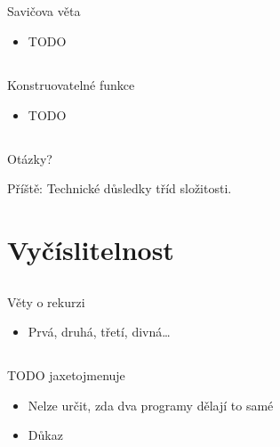 \documentclass{beamer}
\begin{document}
\subsection{}
\begin{frame}{Savičova věta}
\begin{itemize}
\item TODO
\end{itemize}
\end{frame}

\subsection{}
\begin{frame}{Konstruovatelné funkce}
\begin{itemize}
\item TODO
\end{itemize}
\end{frame}

\subsection{}
\begin{frame}{Otázky?}
\begin{center}
Příště: Technické důsledky tříd složitosti.
\end{center}
\end{frame}

\section{Vyčíslitelnost}

\subsection{}
\begin{frame}{Věty o rekurzi}
\begin{itemize}
\item Prvá, druhá, třetí, divná\dots
\end{itemize}
\end{frame}

\subsection{}
\begin{frame}{TODO jaxetojmenuje}
\begin{itemize}
\item Nelze určit, zda dva programy dělají to samé
\item Důkaz
\end{itemize}
\end{frame}
\end{document}

